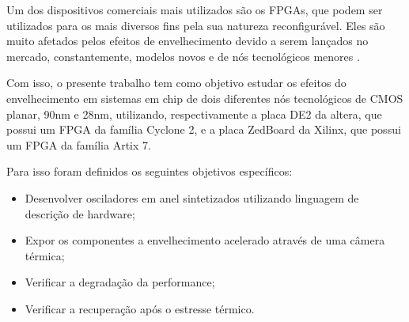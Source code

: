 Um dos dispositivos comerciais mais utilizados são os FPGAs, que podem ser utilizados para os mais diversos fins pela sua natureza reconfigurável. Eles são muito afetados pelos efeitos de envelhecimento devido a serem lançados no mercado, constantemente, modelos novos e de nós tecnológicos menores \cite{Degalahal}.

Com isso, o presente trabalho tem como objetivo estudar os efeitos do envelhecimento em sistemas em chip de dois diferentes nós tecnológicos de CMOS planar, 90nm e 28nm, utilizando, respectivamente a placa DE2 da altera, que possui um FPGA da família Cyclone 2, e a placa ZedBoard da Xilinx, que possui um FPGA da família Artix 7.

Para isso foram definidos os seguintes objetivos específicos:
\begin{itemize}
    \item Desenvolver osciladores em anel sintetizados utilizando linguagem de descrição de hardware;
    \item Expor os componentes a envelhecimento acelerado através de uma câmera térmica;
    \item Verificar a degradação da performance;
    \item Verificar a recuperação após o estresse térmico.
\end{itemize}








